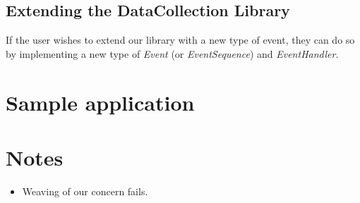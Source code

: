 \documentclass[paper=letter, fontsize=12pt]{scrartcl} %
\numberwithin{equation}{section} %
\numberwithin{figure}{section} %
\numberwithin{table}{section} %
\begin{document}
\subsection{Extending the DataCollection Library}
If the user wishes to extend our library with a new type of event, they can do so by implementing a new type of \textit{Event} (or \textit{EventSequence}) and \textit{EventHandler}.

\section{Sample application}


\section{Notes}
\begin{itemize}
\item Weaving of our concern fails.
\end{itemize}


\end{document}
